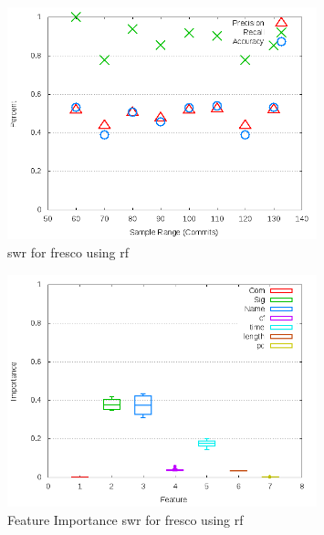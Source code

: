 \begin{figure}[!t]
\centering
\includegraphics[width=0.8\textwidth]{images/rf/test_1/fresco_sample_range.png}
\caption{\gls{swr} for fresco using \gls{rf}}
\label{fig:test_1_fresco_rf}
\end{figure}

\begin{figure}[!t]
\centering
\includegraphics[width=0.8\textwidth]{images/rf/test_1/fresco_importance.png}
\caption{Feature Importance \gls{swr} for fresco using \gls{rf}}
\label{fig:test_1_fresco_rf_importance}
\end{figure}

